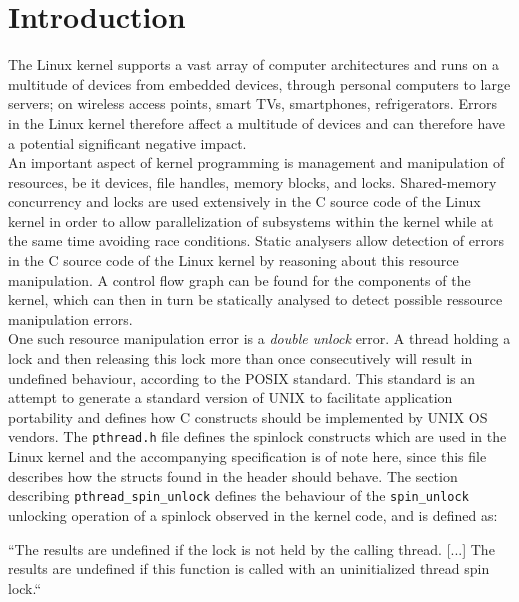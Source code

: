 \section{Introduction}

\noindent The Linux kernel supports a vast array of computer architectures and runs on a multitude of devices from embedded devices, through personal computers to large servers; on wireless
access points, smart TVs, smartphones, refrigerators.
Errors in the Linux kernel therefore affect a multitude of devices and can therefore have a potential significant negative impact. \\

\noindent An important aspect of kernel programming is management and manipulation of resources, be it devices, file handles, memory blocks, and locks. Shared-memory concurrency and locks are used extensively in the C source code of the Linux kernel in order to allow parallelization of subsystems within the kernel while at the same time avoiding race conditions. Static analysers allow detection of errors in the C source code of the Linux kernel by reasoning about this resource manipulation. A control flow graph can be found for the components of the kernel, which can then in turn be statically analysed to detect possible ressource manipulation errors. \\

\noindent One such resource manipulation error is a \textit{double unlock} error. A thread holding a lock and then releasing this lock more than once consecutively will result in undefined behaviour, according to the POSIX standard. This standard is an attempt to generate a standard version of UNIX to facilitate application portability and defines how C constructs should be implemented by UNIX OS vendors. The \texttt{pthread.h} file defines the spinlock constructs which are used in the Linux kernel and the accompanying specification is of note here, since this file describes how the structs found in the header should behave. The section describing \texttt{pthread\_spin\_unlock} defines the behaviour of the \texttt{spin\_unlock} unlocking operation of a spinlock observed in the kernel code, and is defined as:

\begin{center}
``The results are undefined if the lock is not held by the calling thread.
[...] 
The results are undefined if this function is called with an uninitialized thread spin lock.`` \cite{unlockPOSIX} \\
\end{center}

